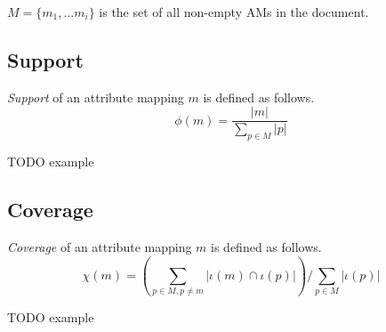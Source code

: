 $M = \{m_1, \dots m_i\}$ is the set of all non-empty AMs in the document.

\subsection{Support}

\begin{define}[Support]
\textit{Support} of an attribute mapping $m$ is defined as follows.
\[\phi(m) = \frac{|m|}{\sum_{p \in M}|p|}\]
\end{define}

TODO example

\subsection{Coverage}

\begin{define}[Coverage]
\textit{Coverage} of an attribute mapping $m$ is defined as follows.
\[\chi(m) = \left( \sum_{p \in M, p \neq m} |\iota(m) \cap \iota(p)| \right) / \sum_{p \in M} |\iota(p)|\]
\end{define}

TODO example